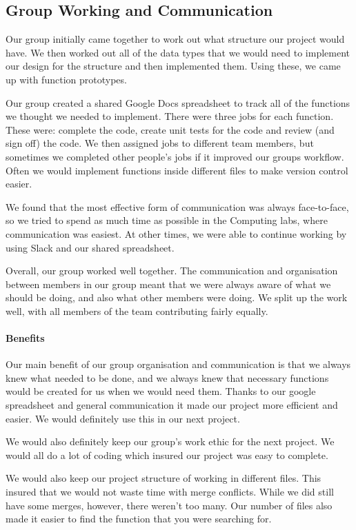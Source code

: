 \documentclass[10pt]{article}
\begin{document}
\subsection{Group Working and Communication}

Our group initially came together to work out what structure our project would have. We then worked out all of the data types that we would need to implement our design for the structure and then implemented them. Using these, we came up with function prototypes.

Our group created a shared Google Docs spreadsheet to track all of the functions we thought we needed to implement. There were three jobs for each function. These were: complete the code, create unit tests for the code and review (and sign off) the code. We then assigned jobs to different team members, but sometimes we completed other people's jobs if it improved our groups workflow. Often we would implement functions inside different files to make version control easier.

We found that the most effective form of communication was always face-to-face, so we tried to spend as much time as possible in the Computing labs, where communication was easiest. At other times, we were able to continue working by using Slack and our shared spreadsheet.

Overall, our group worked well together. The communication and organisation between members in our group meant that we were always aware of what we should be doing, and also what other members were doing. We split up the work well, with all members of the team contributing fairly equally.

\paragraph{Benefits}
Our main benefit of our group organisation and communication is that we always knew what needed to be done, and we always knew that necessary functions would be created for us when we would need them. Thanks to our google spreadsheet and general communication it made our project more efficient and easier. We would definitely use this in our next project.

We would also definitely keep our group’s work ethic for the next project. We would all do a lot of coding which insured our project was easy to complete.

We would also keep our project structure of working in different files. This insured that we would not waste time with merge conflicts. While we did still have some merges, however, there weren’t too many. Our number of files also made it easier to find the function that you were searching for. 
\end{document}
